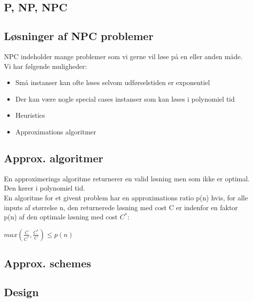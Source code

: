 \documentclass{article}
\begin{document}
\subsection{P, NP, NPC}
\subsection{Løsninger af NPC problemer}
NPC indeholder mange problemer som vi gerne vil løse på en eller anden måde. Vi har følgende muligheder:
\begin{itemize}
	\item Små instanser kan ofte løses selvom udførselstiden er exponentiel
	\item Der kan være nogle special cases instanser som kan løses i polynomiel tid		\item Heuristics
	\item Approximations algoritmer	
\end{itemize}
\subsection{Approx. algoritmer}
En approximerings algoritme returnerer en valid løsning men som ikke er optimal. Den kører i polynomiel tid.\\

En algoritme for et givent problem har en approximations ratio p(n) hvis, for alle inputs af størrelse n,  den returnerede løsning med cost C er indenfor en faktor p(n) af den optimale løsning med cost $C^*$:
\begin{center}
$max(\frac{C}{C^*},\frac{C^*}{C})\le p(n)$
\end{center}
\subsection{Approx. schemes}
\subsection{Design}
\end{document}
